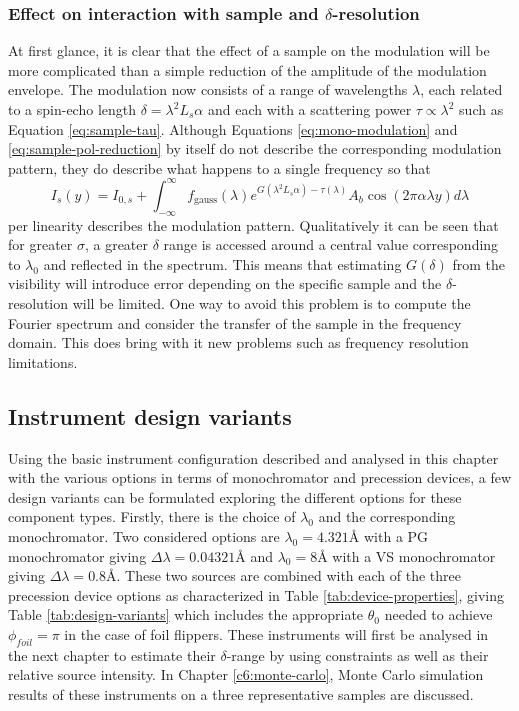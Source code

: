 \documentclass{article}
\begin{document}
\subsubsection{Effect on interaction with sample and $\delta$-resolution}
At first glance, it is clear that the effect of a sample on the modulation will be more complicated than a simple reduction of the amplitude of the modulation envelope. The modulation now consists of a range of wavelengths $\lambda$, each related to a spin-echo length $\delta = \lambda^2 L_s\alpha$ and each with a scattering power $\tau \propto\lambda^2$ such as Equation \eqref{eq:sample-tau}. Although Equations \eqref{eq:mono-modulation} and \eqref{eq:sample-pol-reduction} by itself do not describe the corresponding modulation pattern, they do describe what happens to a single frequency so that
\begin{equation}
	I_s(y) = I_{0,s} + \int_{-\infty}^\infty f_{\text{gauss}}(\lambda)e^{G(\lambda^2 L_s\alpha) - \tau(\lambda)}A_b\cos(2\pi\alpha\lambda y)d\lambda \label{eq:poly-sample-modulation}
\end{equation}
per linearity describes the modulation pattern. Qualitatively it can be seen that for greater $\sigma$, a greater $\delta$ range is accessed around a central value corresponding to $\lambda_0$ and reflected in the spectrum. This means that estimating $G(\delta)$ from the visibility will introduce error depending on the specific sample and the $\delta$-resolution will be limited. One way to avoid this problem is to compute the Fourier spectrum and consider the transfer of the sample in the frequency domain. This does bring with it new problems such as frequency resolution limitations. 


\subsection{Instrument design variants}
\label{c3.7}
Using the basic instrument configuration described and analysed in this chapter with the various options in terms of monochromator and precession devices, a few design variants can be formulated exploring the different options for these component types. Firstly, there is the choice of $\lambda_0$ and the corresponding monochromator. Two considered options are $\lambda_0 = 4.321$Å with a PG monochromator giving $\Delta\lambda = 0.04321$Å and $\lambda_0 = 8$Å with a VS monochromator giving $\Delta\lambda = 0.8$Å. These two sources are combined with each of the three precession device options as characterized in Table \ref{tab:device-properties}, giving Table \ref{tab:design-variants} which includes the appropriate $\theta_0$ needed to achieve $\phi_{foil} = \pi$ in the case of foil flippers. These instruments will first be analysed in the next chapter to estimate their $\delta$-range by using constraints as well as their relative source intensity. In Chapter \ref{c6:monte-carlo}, Monte Carlo simulation results of these instruments on a three representative samples are discussed. 
\end{document}

